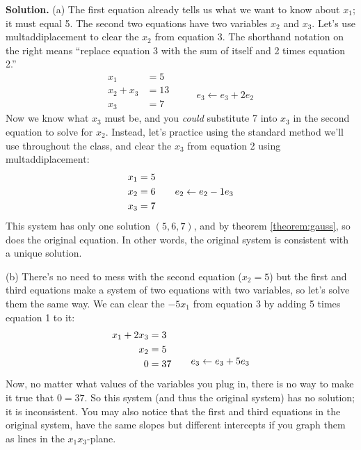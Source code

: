 \documentclass[11pt, letterpaper]{report}
\newenvironment{notes}{}{}
\newenvironment{book}{}{}
\newcounter{theorem}[chapter]
\begin{document}
\begin{notes}
\vfill \vfill
\newpage
\end{notes}

\begin{book}
\textbf{Solution.} (a) The first equation already tells us what we want to know about $x_1$; it must equal 5. The second two equations have two variables $x_2$ and $x_3$. Let's use multaddiplacement to clear the $x_2$ from equation 3. The shorthand notation on the right means ``replace equation 3 with the sum of itself and 2 times equation 2.''
\[\begin{aligned}
x_1 &= 5 \\
x_2 + x_3 &= 13 \\
  x_3 &= 7
\end{aligned} \quad \quad
\begin{matrix}
\\ \\ e_3\leftarrow e_3+2e_2
\end{matrix}
\]
Now we know what $x_3$ must be, and you \emph{could} substitute 7 into $x_3$ in the second equation to solve for $x_2$. Instead, let's practice using the standard method we'll use throughout the class, and clear the $x_3$ from equation 2 using multaddiplacement:
\[\begin{aligned}
x_1 &= 5 \\
x_2 &= 6 \\
  x_3 &= 7
\end{aligned} \quad \quad
\begin{matrix}
\rule{1em}{0em}\\ e_2\leftarrow e_2-1e_3 \\ \rule{1em}{0em}
\end{matrix}
\]
This system has only one solution $(5,6,7)$, and by theorem \ref{theorem:gauss}, so does the original equation. In other words, the original system is consistent with a unique solution.

(b) There's no need to mess with the second equation ($x_2=5$) but the first and third equations make a system of two equations with two variables, so let's solve them the same way. We can clear the $-5x_1$ from equation 3 by adding 5 times equation 1 to it:
\[
\begin{aligned}
x_1 + 2x_3 &= 3 \\
x_2 &= 5 \\
0 &= 37
\end{aligned} \quad \quad 
\begin{matrix}
\rule{1em}{0em}\\ \rule{1em}{0em} \\ e_3\leftarrow e_3+5e_3 
\end{matrix}
\]
Now, no matter what values of the variables you plug in, there is no way to make it true that $0=37$. So this system (and thus the original system) has no solution; it is inconsistent. You may also notice that the first and third equations in the original system, have the same slopes but different intercepts if you graph them as lines in the $x_1x_3$-plane.


\end{book}
\end{document}

